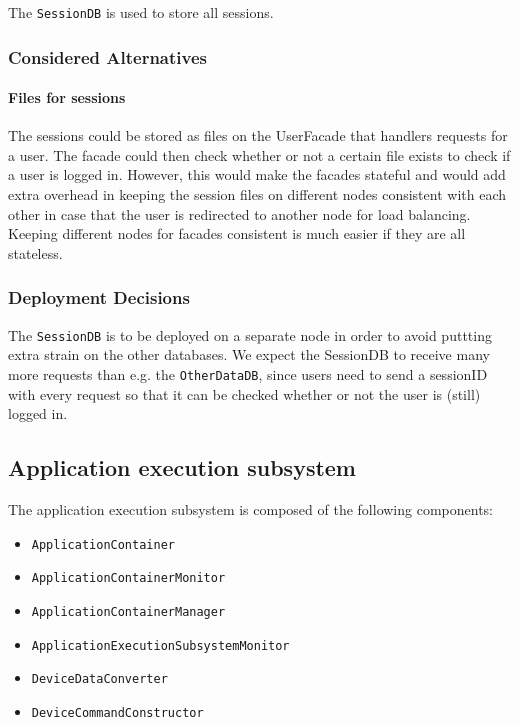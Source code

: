             The \texttt{SessionDB} is used to store all sessions.

        \subsubsection*{Considered Alternatives}
            \paragraph{Files for sessions}
                The sessions could be stored as files on the UserFacade that handlers requests for a user. The facade could then check
                whether or not a certain file exists to check if a user is logged in. However, this would make the facades stateful and
                would add extra overhead in keeping the session files on different nodes consistent with each other in case that the
                user is redirected to another node for load balancing. Keeping different nodes for facades consistent is much easier
                if they are all stateless.

        \subsubsection*{Deployment Decisions}
            The \texttt{SessionDB} is to be deployed on a separate node in order to avoid puttting extra strain on the other databases.
            We expect the SessionDB to receive many more requests than e.g. the \texttt{OtherDataDB}, since users need to send a sessionID
            with every request so that it can be checked whether or not the user is (still) logged in.


    \subsection{Application execution subsystem}
        The application execution subsystem is composed of the following components:
        \begin{itemize}
            \item \texttt{ApplicationContainer}
            \item \texttt{ApplicationContainerMonitor}
            \item \texttt{ApplicationContainerManager}
            \item \texttt{ApplicationExecutionSubsystemMonitor}
            \item \texttt{DeviceDataConverter}
            \item \texttt{DeviceCommandConstructor}
        \end{itemize}

